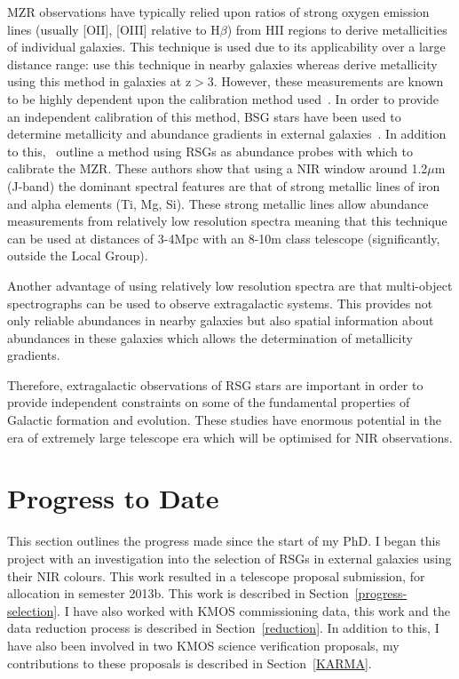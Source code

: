 \documentclass[a4paper,12pt]{article}
\begin{document}
MZR observations have typically relied upon ratios of strong oxygen emission lines (usually [OII], [OIII] relative to H$\beta$) from HII regions to derive metallicities of individual galaxies.
This technique is used due to its applicability over a large distance range:
\cite{Charlot01} use this technique in nearby galaxies whereas \cite{Maiolino08} derive metallicity using this method in galaxies at z$>$3.
However, these measurements are known to be highly dependent upon the calibration method used~\citep{Kewley08, Kudritzki08,Bresolin09}. 
In order to provide an independent calibration of this method, BSG stars have been used to determine metallicity and abundance gradients in external galaxies~\citep{Kudritzki12}. 
In addition to this,~\cite{Davies13b} outline a method using RSGs as abundance probes with which to calibrate the MZR. 
These authors show that using a NIR window around 1.2$\mu$m (J-band) the dominant spectral features are that of strong metallic lines of iron and alpha elements (Ti, Mg, Si).
These strong metallic lines allow abundance measurements from relatively low resolution spectra meaning that this technique can be used at distances of 3-4Mpc with an 8-10m class telescope (significantly, outside the Local Group).


Another advantage of using relatively low resolution spectra are that multi-object spectrographs can be used to observe extragalactic systems. 
This provides not only reliable abundances in nearby galaxies but also spatial information about abundances in these galaxies which allows the determination of metallicity gradients. 

Therefore, extragalactic observations of RSG stars are important in order to provide independent constraints on some of the fundamental properties of Galactic formation and evolution.
These studies have enormous potential in the era of extremely large telescope era which will be optimised for NIR observations. 


\section{Progress to Date}

This section outlines the progress made since the start of my PhD. 
I began this project with an investigation into the selection of RSGs in external galaxies using their NIR colours.
This work resulted in a telescope proposal submission, for allocation in semester 2013b.
This work is described in Section~\ref{progress-selection}. 
I have also worked with KMOS commissioning data, this work and the data reduction process is described in Section~\ref{reduction}. 
In addition to this, I have also been involved in two KMOS science verification proposals, my contributions to these proposals is described in Section~\ref{KARMA}.
\end{document}
